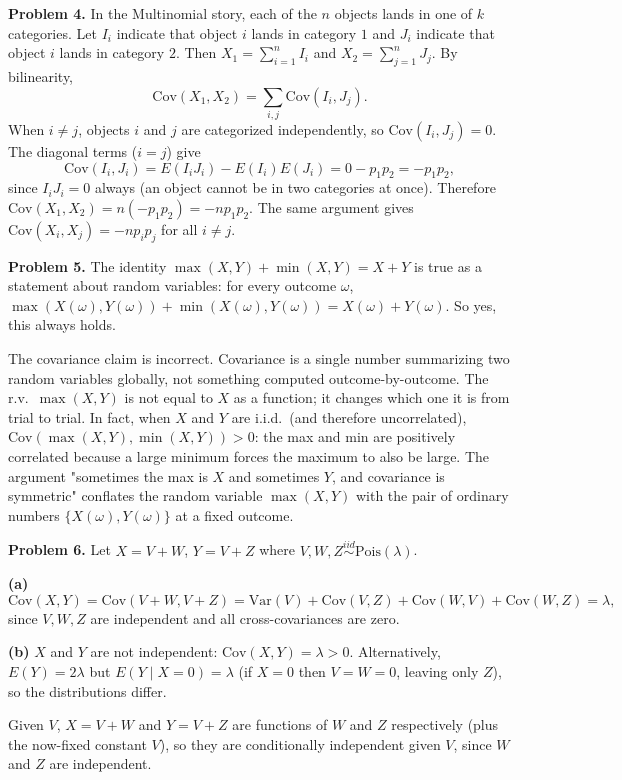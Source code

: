 \documentclass{article}
\begin{document}
\bigskip
\textbf{Problem 4.} In the Multinomial story, each of the $n$ objects lands in one of $k$ categories. Let $I_i$ indicate that object $i$ lands in category $1$ and $J_i$ indicate that object $i$ lands in category $2$. Then $X_1=\sum_{i=1}^n I_i$ and $X_2=\sum_{j=1}^n J_j$. By bilinearity,
$$
\text{Cov}(X_1,X_2) = \sum_{i,j}\text{Cov}(I_i,J_j).
$$
When $i\ne j$, objects $i$ and $j$ are categorized independently, so $\text{Cov}(I_i,J_j)=0$. The diagonal terms ($i=j$) give
$$
\text{Cov}(I_i,J_i) = E(I_i J_i) - E(I_i)E(J_i) = 0 - p_1 p_2 = -p_1 p_2,
$$
since $I_i J_i=0$ always (an object cannot be in two categories at once). Therefore $\text{Cov}(X_1,X_2)=n(-p_1 p_2)=-np_1p_2$. The same argument gives $\text{Cov}(X_i,X_j)=-np_ip_j$ for all $i\ne j$.

\bigskip
\textbf{Problem 5.} The identity $\max(X,Y)+\min(X,Y)=X+Y$ is true as a statement about random variables: for every outcome $\omega$, $\max(X(\omega),Y(\omega))+\min(X(\omega),Y(\omega))=X(\omega)+Y(\omega)$. So yes, this always holds.

The covariance claim is incorrect. Covariance is a single number summarizing two random variables globally, not something computed outcome-by-outcome. The r.v.\ $\max(X,Y)$ is not equal to $X$ as a function; it changes which one it is from trial to trial. In fact, when $X$ and $Y$ are i.i.d.\ (and therefore uncorrelated), $\text{Cov}(\max(X,Y),\min(X,Y))>0$: the max and min are positively correlated because a large minimum forces the maximum to also be large. The argument "sometimes the max is $X$ and sometimes $Y$, and covariance is symmetric" conflates the random variable $\max(X,Y)$ with the pair of ordinary numbers $\{X(\omega),Y(\omega)\}$ at a fixed outcome.

\bigskip
\textbf{Problem 6.} Let $X=V+W$, $Y=V+Z$ where $V,W,Z\overset{iid}{\sim}\text{Pois}(\lambda)$.

\textbf{(a)}
$$
\text{Cov}(X,Y)=\text{Cov}(V+W,V+Z)=\text{Var}(V)+\text{Cov}(V,Z)+\text{Cov}(W,V)+\text{Cov}(W,Z)=\lambda,
$$
since $V,W,Z$ are independent and all cross-covariances are zero.

\textbf{(b)} $X$ and $Y$ are not independent: $\text{Cov}(X,Y)=\lambda>0$. Alternatively, $E(Y)=2\lambda$ but $E(Y\mid X=0)=\lambda$ (if $X=0$ then $V=W=0$, leaving only $Z$), so the distributions differ.

Given $V$, $X=V+W$ and $Y=V+Z$ are functions of $W$ and $Z$ respectively (plus the now-fixed constant $V$), so they are conditionally independent given $V$, since $W$ and $Z$ are independent.
\end{document}

